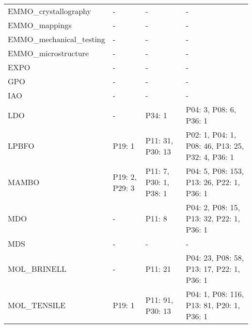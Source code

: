 \begin{tabular}{m{4cm}m{3cm}m{3cm}m{5cm}}
   EMMO_crystallography &              - &                                                 - &                                                         - \\
          EMMO_mappings &              - &                                                 - &                                                         - \\
EMMO_mechanical_testing &              - &                                                 - &                                                         - \\
    EMMO_microstructure &              - &                                                 - &                                                         - \\
                   EXPO &              - &                                                 - &                                                         - \\
                    GPO &              - &                                                 - &                                                         - \\
                    IAO &              - &                                                 - &                                                         - \\
                    LDO &              - &                                            P34: 1 &                                    P04: 3, P08: 6, P36: 1 \\
                  LPBFO &         P19: 1 &                                  P11: 31, P30: 13 &          P02: 1, P04: 1, P08: 46, P13: 25, P32: 4, P36: 1 \\
                  MAMBO & P19: 2, P29: 3 &                            P11: 7, P30: 1, P38: 1 &                 P04: 5, P08: 153, P13: 26, P22: 1, P36: 1 \\
                    MDO &              - &                                            P11: 8 &                  P04: 2, P08: 15, P13: 32, P22: 1, P36: 1 \\
                    MDS &              - &                                                 - &                                                         - \\
            MOL_BRINELL &              - &                                           P11: 21 &                 P04: 23, P08: 58, P13: 17, P22: 1, P36: 1 \\
            MOL_TENSILE &         P19: 1 &                                  P11: 91, P30: 13 &                 P04: 1, P08: 116, P13: 81, P20: 1, P36: 1 \\

\end{tabular}
